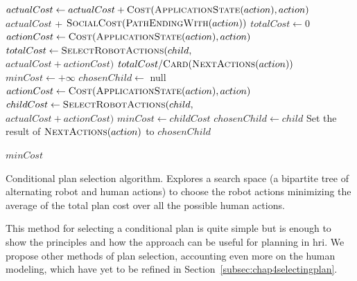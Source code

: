 \documentclass[a4paper,11pt,twoside]{StyleThese}
\begin{document}
\begin{algorithm}[htb]
\begin{algorithmic}[1]
 
	\State $actualCost \leftarrow actualCost + \textsc{Cost}(\textsc{ApplicationState}(action), action)$
	\State \Return $actualCost$ + $\textsc{SocialCost}(\textsc{PathEndingWith}(action))$
\EndIf
{} 
	\State $totalCost \leftarrow 0$
	\State $actionCost \leftarrow \textsc{Cost}(\textsc{ApplicationState}(action), action)$
		\State $totalCost \leftarrow \textsc{SelectRobotActions}(child,$\\
		\hfill$actualCost + actionCost)$
	\EndFor
	\State \Return $totalCost / \textsc{Card}(\textsc{NextActions}(action))$
\Else{} 
	\State $minCost \leftarrow +\infty$
	\State $chosenChild \leftarrow$ null
	\State $actionCost \leftarrow \textsc{Cost}(\textsc{ApplicationState}(action), action)$
		\State $childCost \leftarrow \textsc{SelectRobotActions}(child,$\\
		 \hfill$actualCost + actionCost)$
			\State $minCost \leftarrow childCost$
			\State $chosenChild \leftarrow child$
		\EndIf
	\EndFor
	\State Set the result of $\textsc{NextActions}(action)$ to $chosenChild$
	
	\State \Return $minCost$	
\EndIf
\EndFunction
	
\end{algorithmic}
 \caption{Conditional plan selection algorithm. Explores a search space (a bipartite tree of alternating robot and human actions) to choose the robot actions minimizing the average of the total plan cost over all the possible human actions.}
 \label{alg:minaverage}
\end{algorithm}

This method for selecting a conditional plan is quite simple but is enough to show the principles and how the approach can be useful for planning in \acrshort{hri}. We propose other methods of plan selection, accounting even more on the human modeling, which have yet to be refined in Section~\ref{subsec:chap4selectingplan}.
\end{document}
